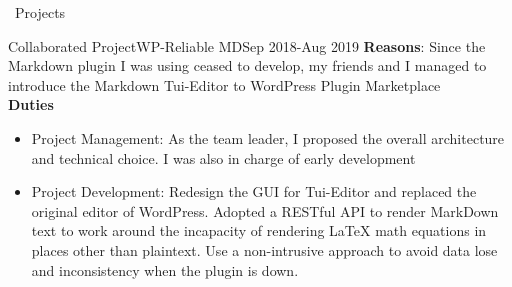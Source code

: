 \documentclass{resume} %
\begin{document}
\begin{rSection}{\faUsers~Projects}
    \begin{rProject}{Collaborated Project}{WP-Reliable MD}{Sep 2018-Aug 2019}
        \textbf{Reasons}: Since the Markdown plugin I was using ceased to develop, my friends and I managed to introduce the Markdown Tui-Editor to WordPress Plugin Marketplace\\
        \textbf{Duties}
        \begin{itemize}
            \itemsep -0.5em \vspace{-0.5em}
            \item Project Management: As the team leader, I proposed the overall architecture and technical choice. I was also in charge of early development
            \item Project Development: Redesign the GUI for Tui-Editor and replaced the original editor of WordPress. Adopted a RESTful API to render MarkDown text to work around the incapacity of rendering LaTeX math equations in places other than plaintext. Use a non-intrusive approach to avoid data lose and inconsistency when the plugin is down.
        \end{itemize}
    \end{rProject}






\end{rSection}
\end{document}
